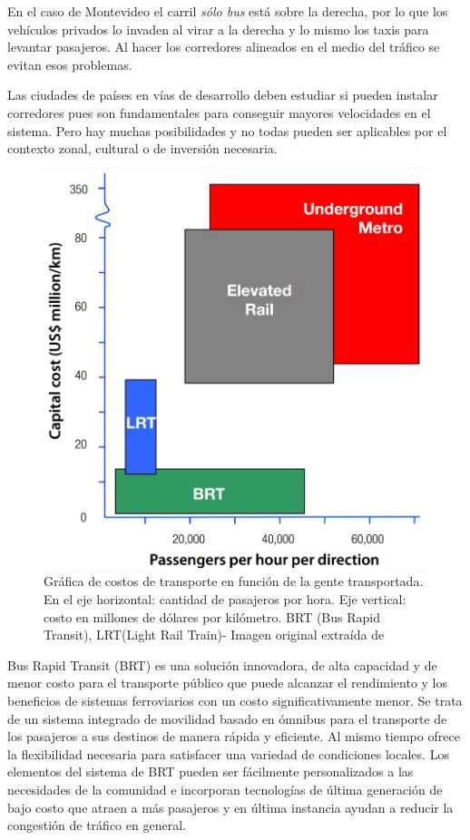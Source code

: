 En el caso de Montevideo el carril \emph{sólo bus} está sobre la derecha, por lo que los vehículos privados lo invaden al virar a la derecha y lo mismo los taxis para levantar pasajeros. Al hacer los corredores alineados en el medio del tráfico se evitan esos problemas.  

Las ciudades de países en vías de desarrollo deben estudiar si pueden instalar corredores pues son fundamentales para conseguir mayores velocidades en el sistema. Pero hay muchas posibilidades y no todas pueden ser aplicables por el contexto zonal, cultural o de inversión necesaria.

\begin{figure}[H]
	\centering
	\includegraphics[width=0.5\linewidth]{Figures/costo_transporte}
	\caption{Gráfica de costos de transporte en función de la gente transportada. En el eje horizontal: cantidad de pasajeros por hora. Eje vertical: costo en millones de dólares por kilómetro.  BRT (Bus Rapid Transit), LRT(Light Rail Train)- Imagen original extraída de \citep{ITDP}		
	}
	\label{fig:Grafica de costos de otros medios de transporte}
\end{figure}

Bus Rapid Transit (BRT) es una solución innovadora, de alta capacidad y de menor costo para el transporte público que puede alcanzar el rendimiento y los beneficios de sistemas ferroviarios con un costo significativamente menor. Se trata de un sistema integrado de movilidad basado en ómnibus para el transporte de los pasajeros a sus destinos de manera rápida y eficiente. Al mismo tiempo ofrece la flexibilidad necesaria para satisfacer una variedad de condiciones locales. Los elementos del sistema de BRT pueden ser fácilmente personalizados a las necesidades de la comunidad e incorporan tecnologías de última generación de bajo costo que atraen a más pasajeros y en última instancia ayudan a reducir la congestión de tráfico en general.

